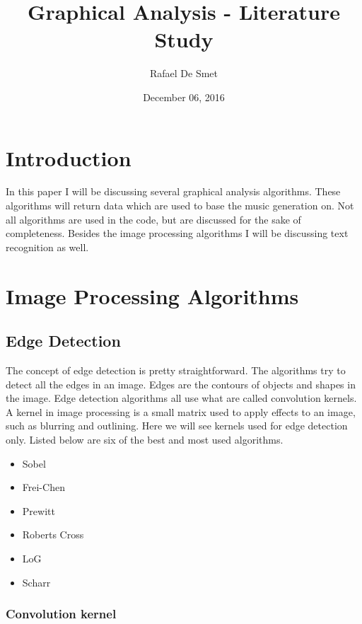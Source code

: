 \documentclass[12pt]{article}
\begin{document}
\title{Graphical Analysis - Literature Study}
\date{December 06, 2016}
\author{Rafael De Smet}

\maketitle
\tableofcontents
\newpage
\section{Introduction}

In this paper I will be discussing several graphical analysis algorithms. These algorithms will return data which are used to base the music generation on. Not all algorithms are used in the code, but are discussed for the sake of completeness. Besides the image processing algorithms I will be discussing text recognition as well.

\section{Image Processing Algorithms}

\subsection{Edge Detection}

The concept of edge detection is pretty straightforward. The algorithms try to detect all the edges in an image. Edges are the contours of objects and shapes in the image.
Edge detection algorithms all use what are called convolution kernels. A kernel in image processing is a small matrix used to apply effects to an image, such as blurring and outlining. Here we will see kernels used for edge detection only. Listed below are six of the best and most used algorithms.

\begin{itemize}
        \item Sobel 
        \item Frei-Chen
        \item Prewitt
        \item Roberts Cross
        \item LoG
        \item Scharr
\end{itemize}

\subsubsection{Convolution kernel}
\end{document}
